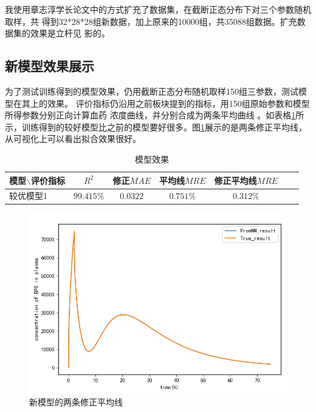 \documentclass{article}
\begin{document}
我使用章志淳学长论文中的方式扩充了数据集，在截断正态分布下对三个参数随机取样，共
得到32*28*28组新数据，加上原来的10000组，共35088组数据。扩充数据集的效果是立杆见
影的。

\subsection*{新模型效果展示}

为了测试训练得到的模型效果，仍用截断正态分布随机取样150组三参数，测试模型在其上的效果。
评价指标仍沿用之前板块提到的指标，用150组原始参数和模型所得参数分别正向计算血药
浓度曲线，并分别合成为两条平均曲线
。如表格\ref{tab1}所示，训练得到的较好模型比之前的模型要好很多。图\ref{fig9}展示的是两条修正平均线，从可视化上可以看出拟合效果很好。

\begin{table}[htbp] 
\caption{\label{tab1}模型效果} 
\begin{tabular}[t]{l|cccccc}
  \toprule
  \small{模型$\backslash$评价指标 }& $R^2$ & \small{修正$MAE$} & \small{平均线$MRE$} & \small{修正平均线$MRE$}  \\
  \midrule
  较优模型1 & $99.415\%$ &$0.0322$ & $0.751\%$ & $0.312\%$ \\

  \bottomrule
\end{tabular}
\end{table}

\begin{figure}[H]
  \centering
  \includegraphics[scale=0.5]{pic9_1.png}
  \caption{新模型的两条修正平均线}
  \label{fig9}
\end{figure}
\end{document}
